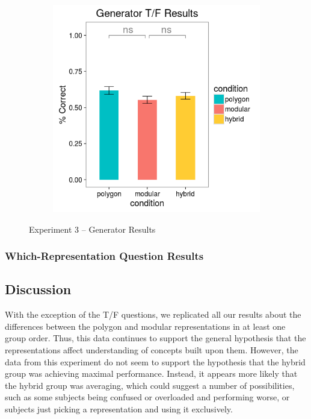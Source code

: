 \documentclass[11pt]{article}
\begin{document}
\begin{figure}[H]
\begin{subfigure}[c]{0.4\textwidth}
\includegraphics[width=\textwidth]{figures/3/gen_TF_r.png}
\end{subfigure}
\caption{Experiment 3 -- Generator Results}
\label{ex3_gen}
\end{figure}\noindent 
\subsubsection{Which-Representation Question Results}
\subsection{Discussion}
With the exception of the T/F questions, we replicated all our results about the differences between the polygon and modular representations in at least one group order. Thus, this data continues to support the general hypothesis that the representations affect understanding of concepts built upon them. However, the data from this experiment do not seem to support the hypothesis that the hybrid group was achieving maximal performance. Instead, it appears more likely that the hybrid group was averaging, which could suggest a  number of possibilities, such as some subjects being confused or overloaded and performing worse, or subjects just picking a representation and using it exclusively. 
\end{document}
